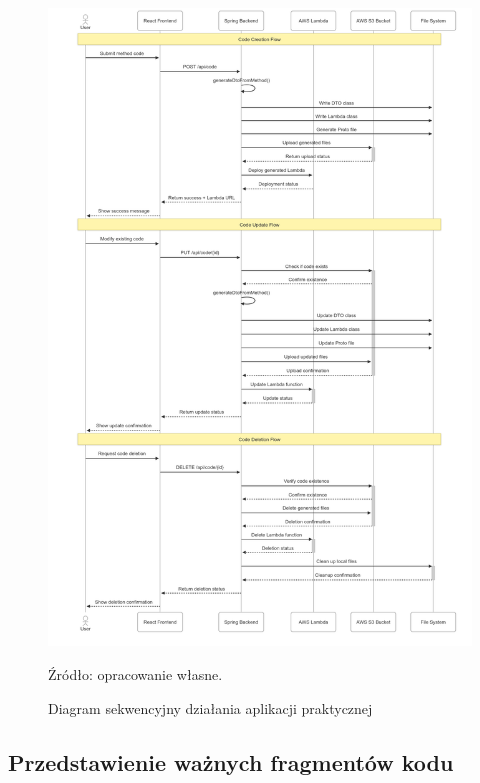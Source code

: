 \documentclass[runningheads,12pt]{llncs}
\begin{document}
\newpage

\begin{figure}[H] %
    \centering
    \includegraphics[width=\linewidth]{images/sequentinal-diagram.png}
    \caption{Diagram sekwencyjny działania aplikacji praktycznej}
    \label{fig2}
    \vspace{0.5em}
    {\small Źródło: opracowanie własne.}
\end{figure}

\newpage


\subsection{Przedstawienie ważnych fragmentów kodu}
\end{document}
